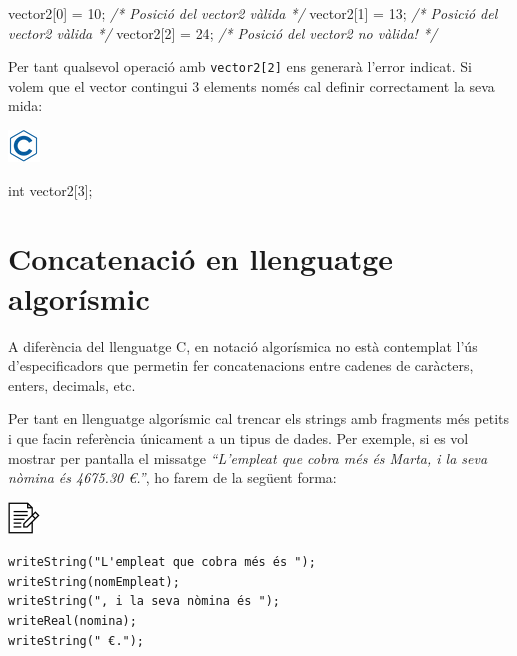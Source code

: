 \documentclass[]{book}
\newcommand{\euro}{€}
\newenvironment{Shaded}{\begin{snugshade}}{\end{snugshade}}
\newcommand{\DataTypeTok}[1]{\textcolor[rgb]{0.13,0.29,0.53}{#1}}
\newcommand{\DecValTok}[1]{\textcolor[rgb]{0.00,0.00,0.81}{#1}}
\newcommand{\CommentTok}[1]{\textcolor[rgb]{0.56,0.35,0.01}{\textit{#1}}}
\newcommand{\NormalTok}[1]{#1}
\begin{document}
\begin{Shaded}
\begin{Highlighting}[]
\NormalTok{vector2[}\DecValTok{0}\NormalTok{] = }\DecValTok{10}\NormalTok{;  }\CommentTok{/* Posició del vector2 vàlida */}
\NormalTok{vector2[}\DecValTok{1}\NormalTok{] = }\DecValTok{13}\NormalTok{;  }\CommentTok{/* Posició del vector2 vàlida */}
\NormalTok{vector2[}\DecValTok{2}\NormalTok{] = }\DecValTok{24}\NormalTok{;  }\CommentTok{/* Posició del vector2 no vàlida! */}
\end{Highlighting}
\end{Shaded}

Per tant qualsevol operació amb \texttt{vector2{[}2{]}} ens generarà
l'error indicat. Si volem que el vector contingui 3 elements només cal
definir correctament la seva mida:

\includegraphics{./img/c.png}

\begin{Shaded}
\begin{Highlighting}[]
\DataTypeTok{int}\NormalTok{ vector2[}\DecValTok{3}\NormalTok{];}
\end{Highlighting}
\end{Shaded}

\section{Concatenació en llenguatge
algorísmic}\label{concatenacio-en-llenguatge-algorismic}

A diferència del llenguatge C, en notació algorísmica no està contemplat
l'ús d'especificadors que permetin fer concatenacions entre cadenes de
caràcters, enters, decimals, etc.

Per tant en llenguatge algorísmic cal trencar els strings amb fragments
més petits i que facin referència únicament a un tipus de dades. Per
exemple, si es vol mostrar per pantalla el missatge \emph{``L'empleat
que cobra més és Marta, i la seva nòmina és 4675.30 \euro{}.''}, ho
farem de la següent forma:

\includegraphics{./img/alg.png}

\begin{verbatim}
writeString("L'empleat que cobra més és ");
writeString(nomEmpleat);
writeString(", i la seva nòmina és ");
writeReal(nomina);
writeString(" €.");
\end{verbatim}
\end{document}
